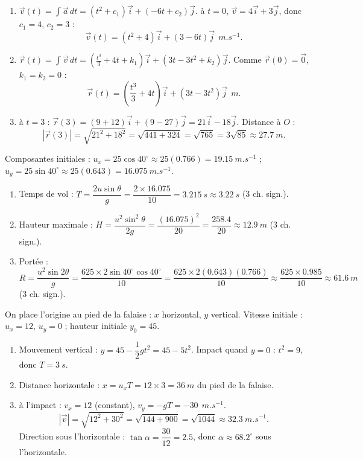 \documentclass[11pt]{article}
\begin{document}
\begin{corrige}
\begin{enumerate}
\item $\vec{v}(t) = \displaystyle\int \vec{a}\,dt = (t^2 + c_1)\vec{i} + (-6t + c_2)\vec{j}$. \`a $t = 0$, $\vec{v} = 4\vec{i} + 3\vec{j}$, donc $c_1 = 4$, $c_2 = 3$ :
\[ \vec{v}(t) = (t^2 + 4)\vec{i} + (3 - 6t)\vec{j}\ \SI{}{m.s^{-1}}. \]
\item $\vec{r}(t) = \displaystyle\int \vec{v}\,dt = \left(\frac{t^3}{3} + 4t + k_1\right)\vec{i} + \left(3t - 3t^2 + k_2\right)\vec{j}$. Comme $\vec{r}(0) = \vec{0}$, $k_1 = k_2 = 0$ :
\[ \vec{r}(t) = \left(\frac{t^3}{3} + 4t\right)\vec{i} + (3t - 3t^2)\vec{j}\ \SI{}{m}. \]
\item \`a $t = 3$ : $\vec{r}(3) = (9 + 12)\vec{i} + (9 - 27)\vec{j} = 21\vec{i} - 18\vec{j}$. Distance \`a $O$ :
\[ |\vec{r}(3)| = \sqrt{21^2 + 18^2} = \sqrt{441 + 324} = \sqrt{765} = 3\sqrt{85} \approx \SI{27.7}{m}. \]
\end{enumerate}
\end{corrige}

\begin{corrige}
Composantes initiales : $u_x = 25\cos 40^\circ \approx 25(0.766) = \SI{19.15}{m.s^{-1}}$ ; $u_y = 25\sin 40^\circ \approx 25(0.643) = \SI{16.075}{m.s^{-1}}$.
\begin{enumerate}
\item Temps de vol : $T = \dfrac{2u\sin\theta}{g} = \dfrac{2 \times 16.075}{10} = \SI{3.215}{s} \approx \SI{3.22}{s}$ (3 ch. sign.).
\item Hauteur maximale : $H = \dfrac{u^2\sin^2\theta}{2g} = \dfrac{(16.075)^2}{20} = \dfrac{258.4}{20} \approx \SI{12.9}{m}$ (3 ch. sign.).
\item Port\'ee : $R = \dfrac{u^2\sin 2\theta}{g} = \dfrac{625 \times 2\sin 40^\circ \cos 40^\circ}{10} = \dfrac{625 \times 2(0.643)(0.766)}{10} \approx \dfrac{625 \times 0.985}{10} \approx \SI{61.6}{m}$ (3 ch. sign.).
\end{enumerate}
\end{corrige}

\begin{corrige}
On place l'origine au pied de la falaise : $x$ horizontal, $y$ vertical. Vitesse initiale : $u_x = 12$, $u_y = 0$ ; hauteur initiale $y_0 = 45$.
\begin{enumerate}
\item Mouvement vertical : $y = 45 - \dfrac{1}{2}gt^2 = 45 - 5t^2$. Impact quand $y = 0$ : $t^2 = 9$, donc $T = \SI{3}{s}$.
\item Distance horizontale : $x = u_x T = 12 \times 3 = \SI{36}{m}$ du pied de la falaise.
\item \`a l'impact : $v_x = 12$ (constant), $v_y = -gT = -30\ \SI{}{m.s^{-1}}$.
\[ |\vec{v}| = \sqrt{12^2 + 30^2} = \sqrt{144 + 900} = \sqrt{1044} \approx \SI{32.3}{m.s^{-1}}. \]
Direction sous l'horizontale : $\tan\alpha = \dfrac{30}{12} = 2.5$, donc $\alpha \approx 68.2^\circ$ sous l'horizontale.
\end{enumerate}
\end{corrige}
\end{document}
